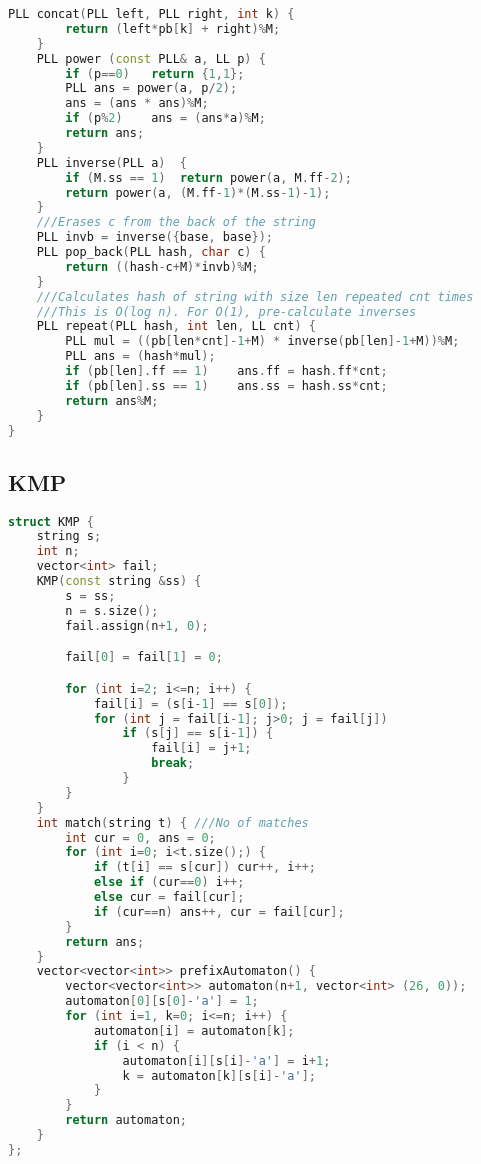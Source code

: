 \documentclass[10pt,a4paper,landscape]{article}
\begin{document}
\begin{multicols}{3}
\begin{lstlisting}[language=C++, breaklines=true]
    PLL concat(PLL left, PLL right, int k) {
        return (left*pb[k] + right)%M;
    }
    PLL power (const PLL& a, LL p) {
        if (p==0)   return {1,1};
        PLL ans = power(a, p/2);
        ans = (ans * ans)%M;
        if (p%2)    ans = (ans*a)%M;
        return ans;
    }
    PLL inverse(PLL a)  {
        if (M.ss == 1)  return power(a, M.ff-2);
        return power(a, (M.ff-1)*(M.ss-1)-1);
    }
    ///Erases c from the back of the string
    PLL invb = inverse({base, base});
    PLL pop_back(PLL hash, char c) {
        return ((hash-c+M)*invb)%M;
    }
    ///Calculates hash of string with size len repeated cnt times
    ///This is O(log n). For O(1), pre-calculate inverses
    PLL repeat(PLL hash, int len, LL cnt) {
        PLL mul = ((pb[len*cnt]-1+M) * inverse(pb[len]-1+M))%M;
        PLL ans = (hash*mul);
        if (pb[len].ff == 1)    ans.ff = hash.ff*cnt;
        if (pb[len].ss == 1)    ans.ss = hash.ss*cnt;
        return ans%M;
    }
}
\end{lstlisting}

\subsection{KMP}
\begin{lstlisting}[language=C++, breaklines=true]
struct KMP {
    string s;
    int n;
    vector<int> fail;
    KMP(const string &ss) {
        s = ss;
        n = s.size();
        fail.assign(n+1, 0);

        fail[0] = fail[1] = 0;

        for (int i=2; i<=n; i++) {
            fail[i] = (s[i-1] == s[0]);
            for (int j = fail[i-1]; j>0; j = fail[j])
                if (s[j] == s[i-1]) {
                    fail[i] = j+1;
                    break;
                }
        }
    }
    int match(string t) { ///No of matches
        int cur = 0, ans = 0;
        for (int i=0; i<t.size();) {
            if (t[i] == s[cur]) cur++, i++;
            else if (cur==0) i++;
            else cur = fail[cur];
            if (cur==n) ans++, cur = fail[cur];
        }
        return ans;
    }
    vector<vector<int>> prefixAutomaton() {
        vector<vector<int>> automaton(n+1, vector<int> (26, 0));
        automaton[0][s[0]-'a'] = 1;
        for (int i=1, k=0; i<=n; i++) {
            automaton[i] = automaton[k];
            if (i < n) {
                automaton[i][s[i]-'a'] = i+1;
                k = automaton[k][s[i]-'a'];
            }
        }
        return automaton;
    }
};
\end{lstlisting}


\end{multicols}
\end{document}
